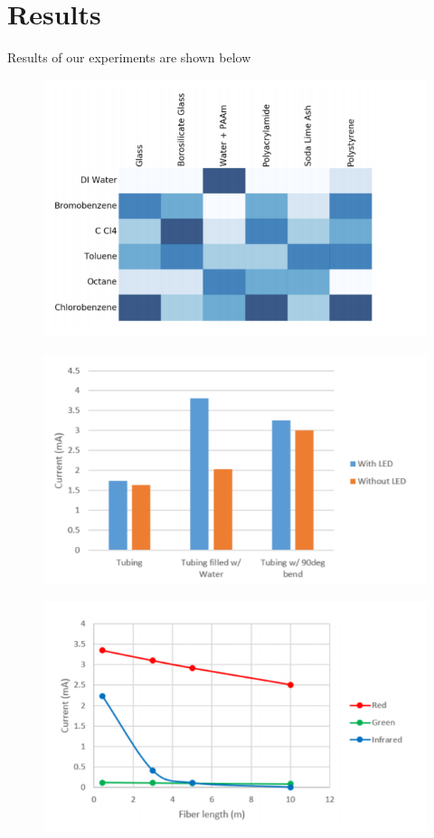 \documentclass{article}
\begin{document}
\section{Results}

Results of our experiments are shown below

\begin{figure}[h!]
\centering
\includegraphics[scale=0.6]{refract.png}
\end{figure}

\begin{figure}[h!]
\centering
\includegraphics[scale=0.8]{lights.png}
\end{figure}

\begin{figure}[h!]
\centering
\includegraphics[scale=0.8]{wave.png}
\end{figure}
\end{document}
